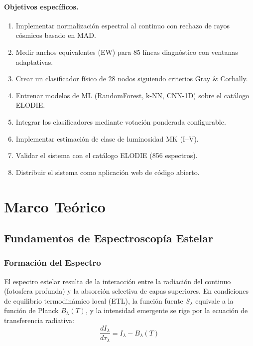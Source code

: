 \documentclass[12pt,a4paper]{article}
\begin{document}
\paragraph{Objetivos específicos.}
\begin{enumerate}
  \item Implementar normalización espectral al continuo con rechazo de rayos cósmicos
        basado en MAD.
  \item Medir anchos equivalentes (EW) para 85 líneas diagnóstico con ventanas
        adaptativas.
  \item Crear un clasificador físico de 28 nodos siguiendo criterios Gray \& Corbally.
  \item Entrenar modelos de ML (RandomForest, k-NN, CNN-1D) sobre el catálogo ELODIE.
  \item Integrar los clasificadores mediante votación ponderada configurable.
  \item Implementar estimación de clase de luminosidad MK (I--V).
  \item Validar el sistema con el catálogo ELODIE (856 espectros).
  \item Distribuir el sistema como aplicación web de código abierto.
\end{enumerate}

\section{Marco Teórico}

\subsection{Fundamentos de Espectroscopía Estelar}

\subsubsection{Formación del Espectro}

El espectro estelar resulta de la interacción entre la radiación del continuo
(fotosfera profunda) y la absorción selectiva de capas superiores. En condiciones de
equilibrio termodinámico local (ETL), la función fuente $S_\lambda$ equivale a la
función de Planck $B_\lambda(T)$, y la intensidad emergente se rige por la ecuación de
transferencia radiativa:
\begin{equation}
  \frac{dI_\lambda}{d\tau_\lambda} = I_\lambda - B_\lambda(T)
\end{equation}
\end{document}
